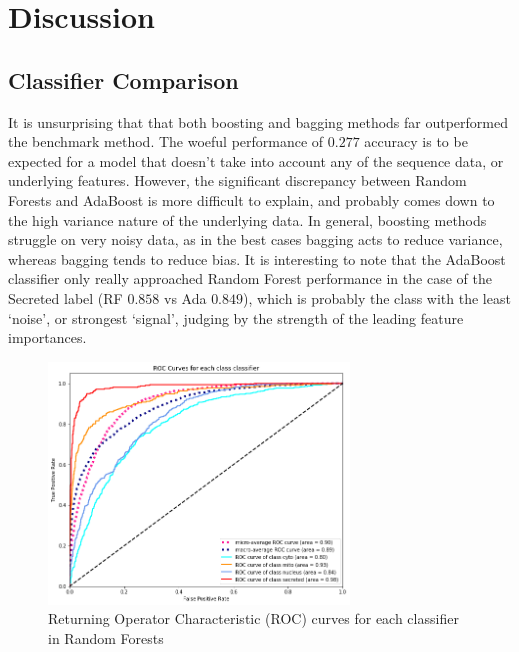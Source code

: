 \documentclass{bioinfo}
\begin{document}
\section{Discussion}

\subsection{Classifier Comparison}

It is unsurprising that that both boosting and bagging methods far outperformed the benchmark method. 
The woeful performance of $0.277$ accuracy is to be expected for a model that doesn't take into account any of the sequence data, or underlying features. 
However, the significant discrepancy between Random Forests and AdaBoost is more difficult to explain, and probably comes down to the high variance nature of the underlying data. 
In general, boosting methods struggle on very noisy data, as in the best cases bagging acts to reduce variance, whereas bagging tends to reduce bias. 
It is interesting to note that the AdaBoost classifier only really approached Random Forest performance in the case of the Secreted label (RF $0.858$ vs Ada $0.849$), which is probably the class with the least `noise', or strongest `signal', judging by the strength of the leading feature importances.

\begin{figure}[!h]
\includegraphics[width=8cm]{roc_curve}
\caption{Returning Operator Characteristic (ROC) curves for each classifier in Random Forests }
\label{fig:roc}
\centering
\end{figure}
\end{document}
